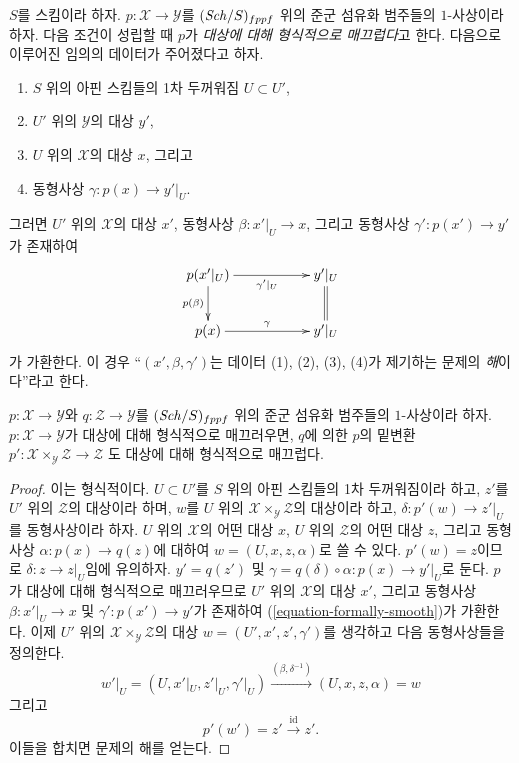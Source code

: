 \noindent
$S$를 스킴이라 하자. $p : \mathcal{X} \to \mathcal{Y}$를
$(\mathit{Sch}/S)_{fppf}$ 위의 준군 섬유화 범주들의 $1$-사상이라 하자.
다음 조건이 성립할 때 $p$가 {\it 대상에 대해 형식적으로 매끄럽다}고 한다.
다음으로 이루어진 임의의 데이터가 주어졌다고 하자.
\begin{enumerate}
\item $S$ 위의 아핀 스킴들의 1차 두꺼워짐 $U \subset U'$,
\item $U'$ 위의 $\mathcal{Y}$의 대상 $y'$,
\item $U$ 위의 $\mathcal{X}$의 대상 $x$, 그리고
\item 동형사상 $\gamma : p(x) \to y'|_U$.
\end{enumerate}
그러면 $U'$ 위의 $\mathcal{X}$의 대상 $x'$, 동형사상
$\beta : x'|_U \to x$, 그리고 동형사상 $\gamma' : p(x') \to y'$가
존재하여
\begin{equation}
\label{equation-formally-smooth}
\vcenter{
\xymatrix{
p(x'|_U) \ar[d]_{p(\beta)} \ar[rr]_{\gamma'|_U} & &
y'|_U \ar@{=}[d] \\
p(x) \ar[rr]^\gamma & & y'|_U
}
}
\end{equation}
가 가환한다. 이 경우 “$(x', \beta, \gamma')$는 데이터
(1), (2), (3), (4)가 제기하는 문제의 {\it 해}이다”라고 한다.

\begin{lemma}
\label{lemma-base-change-formally-smooth}
$p : \mathcal{X} \to \mathcal{Y}$와 $q : \mathcal{Z} \to \mathcal{Y}$를
$(\mathit{Sch}/S)_{fppf}$ 위의 준군 섬유화 범주들의 $1$-사상이라 하자.
$p : \mathcal{X} \to \mathcal{Y}$가 대상에 대해 형식적으로
매끄러우면, $q$에 의한 $p$의 밑변환
$p' : \mathcal{X} \times_\mathcal{Y} \mathcal{Z} \to \mathcal{Z}$
도 대상에 대해 형식적으로 매끄럽다.
\end{lemma}

\begin{proof}
이는 형식적이다. $U \subset U'$를 $S$ 위의 아핀 스킴들의
1차 두꺼워짐이라 하고, $z'$를 $U'$ 위의 $\mathcal{Z}$의 대상이라
하며, $w$를 $U$ 위의
$\mathcal{X} \times_\mathcal{Y} \mathcal{Z}$의 대상이라 하고,
$\delta : p'(w) \to z'|_U$를 동형사상이라 하자.
$U$ 위의 $\mathcal{X}$의 어떤 대상 $x$, $U$ 위의 $\mathcal{Z}$의
어떤 대상 $z$, 그리고 동형사상 $\alpha : p(x) \to q(z)$에 대하여
$w = (U, x, z, \alpha)$로 쓸 수 있다. $p'(w) = z$이므로
$\delta : z \to z|_U$임에 유의하자. $y' = q(z')$ 및
$\gamma = q(\delta) \circ \alpha : p(x) \to y'|_U$로 둔다.
$p$가 대상에 대해 형식적으로 매끄러우므로 $U'$ 위의
$\mathcal{X}$의 대상 $x'$, 그리고 동형사상
$\beta : x'|_U \to x$ 및 $\gamma' : p(x') \to y'$가 존재하여
(\ref{equation-formally-smooth})가 가환한다. 이제 $U'$ 위의
$\mathcal{X} \times_\mathcal{Y} \mathcal{Z}$의 대상
$w = (U', x', z', \gamma')$를 생각하고 다음 동형사상들을 정의한다.
$$
w'|_U = (U, x'|_U, z'|_U, \gamma'|_U)
\xrightarrow{(\beta, \delta^{-1})}
(U, x, z, \alpha) = w
$$
그리고
$$
p'(w') = z' \xrightarrow{\text{id}} z'.
$$
이들을 합치면 문제의 해를 얻는다.
\end{proof}


